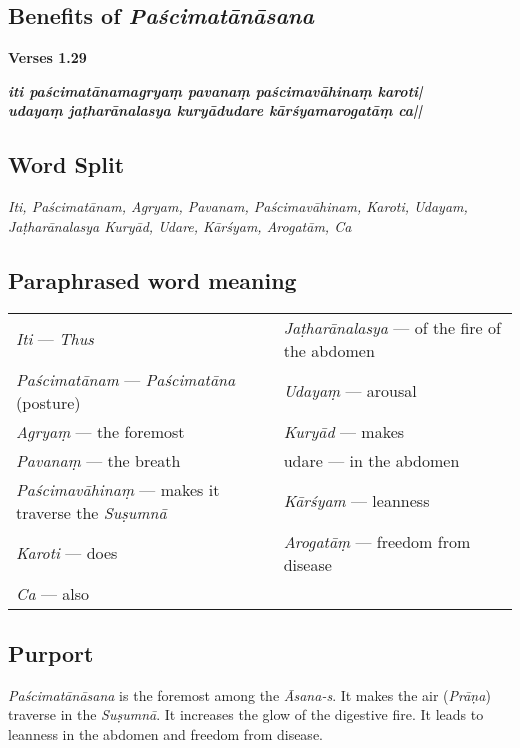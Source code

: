 \subsection*{Benefits of \textit{Paścimatānāsana}}
\vspace{-10pt}

\noindent 
\textbf{Verses 1.29}

\begin{shloka}
\textit{\textbf{iti paścimatānamagryaṃ pavanaṃ paścimavāhinaṃ karoti|}\\
\textbf{udayaṃ jaṭharānalasya kuryādudare kārśyamarogatāṃ ca||}}
\end{shloka}
\vspace{-10pt}

\subsection*{Word Split}
\vspace{-10pt}

\textit{Iti, Paścimatānam, Agryam, Pavanam, Paścimavāhinam, Karoti, Udayam, Jaṭharānalasya Kuryād, Udare, Kārśyam, Arogatām, Ca}

\subsection*{Paraphrased word meaning}
\vspace{-10pt}

\begin{longtable}{>{\noindent\raggedright}p{5cm}>{\noindent\raggedright}p{5cm}}
\textit{Iti} --- \textit{Thus} & \textit{Jaṭharānalasya} --- of the fire of the abdomen\tabularnewline
\textit{Paścimatānam} --- \textit{Paścimatāna} (posture) & \textit{Udayaṃ} --- arousal\tabularnewline
\textit{Agryaṃ}  --- the foremost &  \textit{Kuryād} --- makes\tabularnewline
\textit{Pavanaṃ} --- the breath  & udare --- in the abdomen\tabularnewline
\textit{Paścimavāhinaṃ} --- makes it traverse the \textit{Suṣumnā} & \textit{Kārśyam} --- leanness\tabularnewline
\textit{Karoti} --- does & \textit{Arogatāṃ} --- freedom from disease \tabularnewline
\textit{Ca} --- also & 
\end{longtable}
\vspace{-10pt}

\subsection*{Purport}

\textit{Paścimatānāsana} is the foremost among the \textit{Āsana-s}. It makes the air (\textit{Prāṇa}) traverse in the \textit{Suṣumnā}. It increases the glow of the digestive fire. It leads to leanness in the abdomen and freedom from disease.
\vspace{-10pt}

